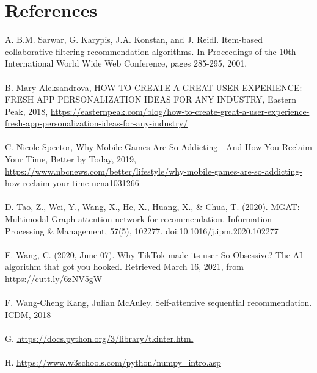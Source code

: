 \documentclass[fontsize=11pt]{article}
\begin{document}
    \section*{References}

    A. B.M. Sarwar, G. Karypis, J.A. Konstan, and J. Reidl. Item-based collaborative filtering recommendation algorithms. In Proceedings of the 10th International World Wide Web Conference, pages 285-295, 2001.
    \\
    \\
    B. Mary Aleksandrova, HOW TO CREATE A GREAT USER EXPERIENCE: FRESH APP PERSONALIZATION IDEAS FOR ANY INDUSTRY, Eastern Peak, 2018, \url{https://easternpeak.com/blog/how-to-create-great-a-user-experience-fresh-app-personalization-ideas-for-any-industry/}
    \\
    \\
    C. Nicole Spector, Why Mobile Games Are So Addicting - And How You Reclaim Your Time, Better by Today, 2019,  \url{https://www.nbcnews.com/better/lifestyle/why-mobile-games-are-so-addicting-how-reclaim-your-time-ncna1031266}
    \\
    \\
    D. Tao, Z., Wei, Y., Wang, X., He, X., Huang, X., $\&$ Chua, T. (2020). MGAT: Multimodal Graph attention network for recommendation. Information Processing $\&$ Management, 57(5), 102277. doi:10.1016/j.ipm.2020.102277
    \\
    \\
    E. Wang, C. (2020, June 07). Why TikTok made its user So Obsessive? The AI algorithm that got you hooked. Retrieved March 16, 2021, from \url{https://cutt.ly/6zNV5gW}
    \\
    \\
    F. Wang-Cheng Kang, Julian McAuley. Self-attentive sequential recommendation. ICDM, 2018
    \\
    \\
    G. \url{https://docs.python.org/3/library/tkinter.html}
    \\
    \\
    H. \url{https://www.w3schools.com/python/numpy_intro.asp}
\end{document}
